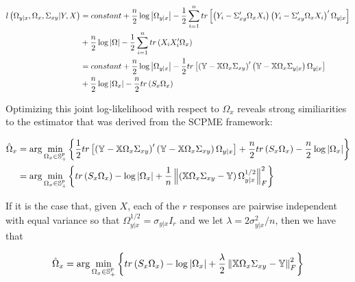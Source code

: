 \documentclass[11pt,]{report}
\theoremstyle{definition}
\theoremstyle{definition}
\theoremstyle{definition}
\theoremstyle{remark}
\begin{document}
\begin{equation}
\begin{split}
  l\left( \Omega_{y | x}, \Omega_{x}, \Sigma_{xy} | Y, X \right) &= constant + \frac{n}{2}\log\left| \Omega_{y | x} \right| - \frac{1}{2}\sum_{i = 1}^{n} tr\left[ \left( Y_{i} - \Sigma_{xy}'\Omega_{x} X_{i} \right)\left( Y_{i} - \Sigma_{xy}'\Omega_{x} X_{i} \right)'\Omega_{y | x} \right] \\
  &+\frac{n}{2}\log\left| \Omega \right| - \frac{1}{2}\sum_{i = 1}^{n}tr\left( X_{i}X_{i}'\Omega_{x} \right) \\
  &= constant + \frac{n}{2}\log\left| \Omega_{y | x} \right| - \frac{1}{2}tr\left[ \left( \mathbb{Y} - \mathbb{X}\Omega_{x}\Sigma_{xy} \right)'\left( \mathbb{Y} - \mathbb{X}\Omega_{x}\Sigma_{y | x} \right)\Omega_{y | x} \right] \\
  &+ \frac{n}{2}\log\left| \Omega_{x} \right| - \frac{n}{2}tr\left( S_{x}\Omega_{x} \right)
\end{split}
\label{eq:partialjointloglik}\notag
\end{equation}

Optimizing this joint log-likelihood with respect to \(\Omega_{x}\) reveals strong similiarities to the estimator that was derived from the SCPME framework:

\begin{equation}
\begin{split}
  \hat{\Omega}_{x} &= \arg\min_{\Omega_{x} \in \mathbb{S}_{+}^{p}}\left\{ \frac{1}{2}tr\left[ \left( \mathbb{Y} - \mathbb{X}\Omega_{x}\Sigma_{xy} \right)'\left( \mathbb{Y} - \mathbb{X}\Omega_{x}\Sigma_{xy} \right)\Omega_{y | x} \right] + \frac{n}{2}tr\left( S_{x}\Omega_{x} \right) - \frac{n}{2}\log\left| \Omega_{x} \right| \right\} \\
  &= \arg\min_{\Omega_{x} \in \mathbb{S}_{+}^{p}}\left\{ tr\left( S_{x}\Omega_{x} \right) - \log\left| \Omega_{x} \right| + \frac{1}{n}\left\| \left( \mathbb{X}\Omega_{x}\Sigma_{xy} - \mathbb{Y} \right)\Omega_{y | x}^{1/2} \right\|_{F}^{2} \right\}
\end{split}
\label{eq:omegajointloglik}\notag
\end{equation}

If it is the case that, given \(X\), each of the \(r\) responses are pairwise independent with equal variance so that \(\Omega_{y | x}^{1/2} = \sigma_{y | x}I_{r}\) and we let \(\lambda = 2\sigma_{y | x}^{2}/n\), then we have that

\begin{equation}
\hat{\Omega}_{x} = \arg\min_{\Omega_{x} \in \mathbb{S}_{+}^{p}}\left\{ tr\left( S_{x}\Omega_{x} \right) - \log\left| \Omega_{x} \right| + \frac{\lambda}{2}\left\| \mathbb{X}\Omega_{x}\Sigma_{xy} - \mathbb{Y} \right\|_{F}^{2} \right\}
\label{eq:omegajointmle}\notag
\end{equation}
\end{document}
